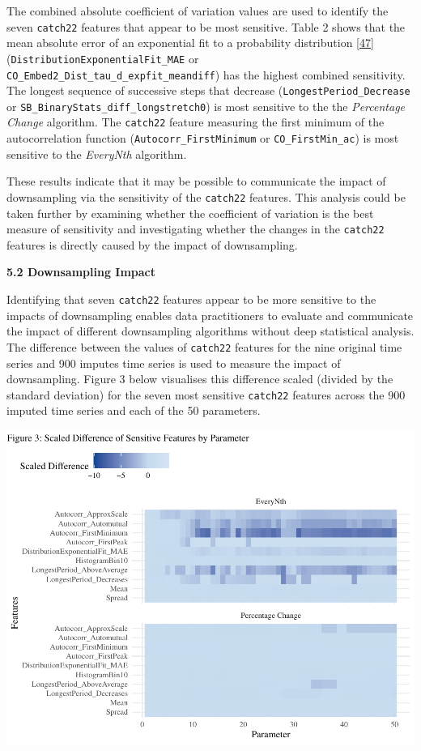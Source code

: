 \documentclass{article}
\begin{document}
The combined absolute coefficient of variation values are used to
identify the seven \texttt{catch22} features that appear to be most
sensitive. Table 2 shows that the mean absolute error of an exponential
fit to a probability distribution
\protect\hyperlink{ref-feature_book}{{[}47{]}}
(\texttt{DistributionExponentialFit\_MAE} or
\texttt{CO\_Embed2\_Dist\_tau\_d\_expfit\_meandiff}) has the highest
combined sensitivity. The longest sequence of successive steps that
decrease (\texttt{LongestPeriod\_Decrease} or
\texttt{SB\_BinaryStats\_diff\_longstretch0}) is most sensitive to the
the \emph{Percentage Change} algorithm. The \texttt{catch22} feature
measuring the first minimum of the autocorrelation function
(\texttt{Autocorr\_FirstMinimum} or \texttt{CO\_FirstMin\_ac}) is most
sensitive to the \emph{EveryNth} algorithm.

These results indicate that it may be possible to communicate the impact
of downsampling via the sensitivity of the \texttt{catch22} features.
This analysis could be taken further by examining whether the
coefficient of variation is the best measure of sensitivity and
investigating whether the changes in the \texttt{catch22} features is
directly caused by the impact of downsampling.

\textbf{5.2 Downsampling Impact}

Identifying that seven \texttt{catch22} features appear to be more
sensitive to the impacts of downsampling enables data practitioners to
evaluate and communicate the impact of different downsampling algorithms
without deep statistical analysis. The difference between the values of
\texttt{catch22} features for the nine original time series and 900
imputes time series is used to measure the impact of downsampling.
Figure 3 below visualises this difference scaled (divided by the
standard deviation) for the seven most sensitive \texttt{catch22}
features across the 900 imputed time series and each of the 50
parameters.

\includegraphics{210431461_CSC8639_Dissertation_files/figure-latex/Heatmap_param-1.pdf}
\end{document}
